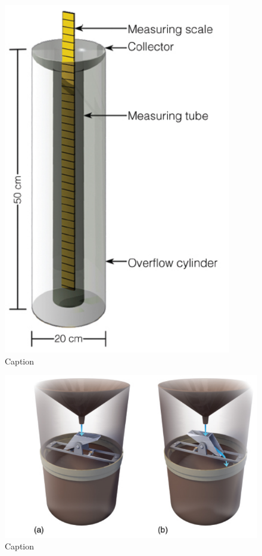 \documentclass[12pt,oneside]{book}
\begin{document}
\begin{figure}

{\centering \includegraphics[width=0.5\linewidth]{figures/Figure349} 

}

\caption{Caption}\label{fig:Precipmeas}
\end{figure}

\begin{figure}

{\centering \includegraphics[width=0.9\linewidth]{figures/Figure350} 

}

\caption{Caption}\label{fig:Precipmeas2}
\end{figure}
\end{document}
